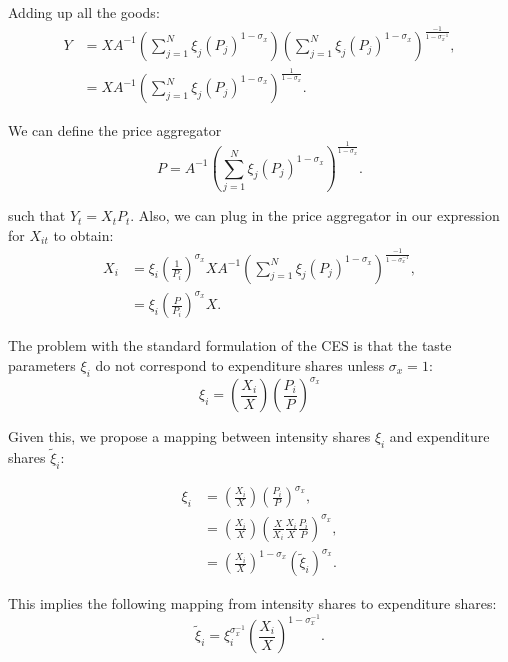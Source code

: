 Adding up all the goods:
\begin{align*}
Y & =XA^{-1}\left(\sum_{j=1}^{N}\xi_{j}\left(P_{j}\right)^{1-\sigma_{x}}\right)\left(\sum_{j=1}^{N}\xi_{j}\left(P_{j}\right)^{1-\sigma_{x}}\right)^{\frac{-1}{1-\sigma_{x}^{-1}}},\\
 & =XA^{-1}\left(\sum_{j=1}^{N}\xi_{j}\left(P_{j}\right)^{1-\sigma_{x}}\right)^{\frac{1}{1-\sigma_{x}}}.
\end{align*}

We can define the price aggregator
\[
P=A^{-1}\left(\sum_{j=1}^{N}\xi_{j}\left(P_{j}\right)^{1-\sigma_{x}}\right)^{\frac{1}{1-\sigma_{x}}}.
\]

such that $Y_{t}=X_{t}P_{t}$. Also, we can plug in the price aggregator
in our expression for $X_{it}$ to obtain:
\begin{align*}
X_{i} & =\xi_{i}\left(\frac{1}{P_{i}}\right)^{\sigma_{x}}XA^{-1}\left(\sum_{j=1}^{N}\xi_{j}\left(P_{j}\right)^{1-\sigma_{x}}\right)^{\frac{-1}{1-\sigma_{x}^{-1}}},\\
 & =\xi_{i}\left(\frac{P}{P_{i}}\right)^{\sigma_{x}}X.
\end{align*}

The problem with the standard formulation of the CES is that the taste
parameters $\xi_{i}$ do not correspond to expenditure shares unless
$\sigma_{x}=1$:
\[
\xi_{i}=\left(\frac{X_{i}}{X}\right)\left(\frac{P_{i}}{P}\right)^{\sigma_{x}}
\]

Given this, we propose a mapping between intensity shares
$\xi_{i}$ and expenditure shares $\tilde{{\xi}}_{i}$:

\begin{align*}
\xi_{i} & =\left(\frac{X_{i}}{X}\right)\left(\frac{P_{i}}{P}\right)^{\sigma_{x}},\\
 & =\left(\frac{X_{i}}{X}\right)\left(\frac{X}{X_{i}}\frac{X_{i}}{X}\frac{P_{i}}{P}\right)^{\sigma_{x}},\\
 & =\left(\frac{X_{i}}{X}\right)^{1-\sigma_{x}}\left(\tilde{{\xi}}_{i}\right)^{\sigma_{x}}.
\end{align*}

This implies the following mapping from intensity shares to expenditure
shares:
\[
\tilde{{\xi}}_{i}=\xi_{i}^{\sigma_{x}^{-1}}\left(\frac{X_{i}}{X}\right)^{1-\sigma_{x}^{-1}}.
\]

